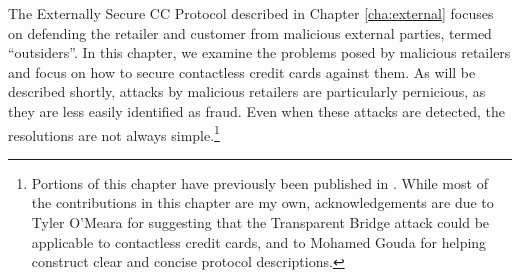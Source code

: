 The Externally Secure CC Protocol described in Chapter \ref{cha:external} focuses on defending the retailer and customer from malicious external parties, termed ``outsiders''.
In this chapter, we examine the problems posed by malicious retailers and focus on how to secure contactless credit cards against them.
As will be described shortly, attacks by malicious retailers are particularly pernicious, as they are less easily identified as fraud.
Even when these attacks are detected, the resolutions are not always simple.\footnote{
        Portions of this chapter have previously been published in \cite{jensen2}.
        While most of the contributions in this chapter are my own,
        acknowledgements are due to Tyler O'Meara for suggesting that the Transparent Bridge attack could be applicable to contactless credit cards,
        and to Mohamed Gouda for helping construct clear and concise protocol descriptions.
}
